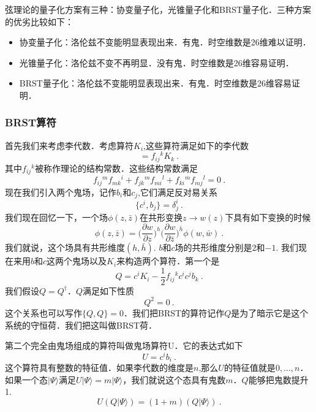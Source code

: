 
弦理论的量子化方案有三种：协变量子化，光锥量子化和BRST量子化．三种方案的优劣比较如下：
\begin{itemize}
\item 协变量子化：洛伦兹不变能明显表现出来．有鬼．时空维数是26维难以证明．
\item 光锥量子化：洛伦兹不变不再明显．没有鬼．时空维数是26维容易证明．
\item BRST量子化：洛伦兹不变能明显表现出来．有鬼．时空维数是26维容易证明．
\end{itemize}
\subsubsection{BRST算符}
首先我们来考虑李代数．考虑算符$K_i$,这些算符满足如下的李代数
\begin{equation}
[K_i,K_j] = f_{ij}{}^k K_k~.
\end{equation}
其中$f_{ij}{}^k$被称作理论的结构常数．这些结构常数满足
\begin{equation}
f_{ij}{}^m f_{mk}{}^i + f_{jk}{}^m f_{mi}{}^l+f_{ki}{}^m f_{mj}{}^l = 0 ~. 
\end{equation}
现在我们引入两个鬼场，记作$b_i$和$c_j$,它们满足反对易关系
\begin{equation}
\{ c^i, b_j \} = \delta^i_j~.
\end{equation}
我们现在回忆一下，一个场$\phi(z,\bar z)$在共形变换$z\rightarrow w(z)$下具有如下变换的时候
\begin{equation}
\phi(z,\bar z) = \bigg( \frac{\partial w}{\partial z} \bigg)^h \bigg( \frac{\partial w}{\partial \bar z} \bigg)^{\bar h} \phi (w,\bar w)~.
\end{equation}
我们就说，这个场具有共形维度$(h,\bar h)$. $b$和$c$场的共形维度分别是$2$和$-1$. 我们现在来用$b$和$c$这两个鬼场以及$K_i$来构造两个算符．第一个是
\begin{equation}
Q = c^i K_i - \frac{1}{2} f_{ij}{}^k c^i c^j b_k~.
\end{equation}
我们假设$Q = Q^\dagger$．$Q$满足如下性质
\begin{equation}
Q^2 = 0~.
\end{equation}
这个关系也可以写作$\{Q,Q\}=0$．我们把BRST的算符记作$Q$是为了暗示它是这个系统的守恒荷．我们把这叫做BRST荷．

第二个完全由鬼场组成的算符叫做鬼场算符U．它的表达式如下
\begin{equation}\label{BRST_eq1}
U = c^i b_i~.
\end{equation}
这个算符具有整数的特征值．如果李代数的维度是$n$,那么$U$的特征值就是$0,\ldots ,n$．如果一个态$|\Psi\rangle$满足$U|\Psi\rangle=m|\Psi\rangle$，我们就说这个态具有鬼数$m$．$Q$能够把鬼数提升1.
\begin{equation}
U (Q|\Psi\rangle) = (1+m) (Q|\Psi\rangle)~. 
\end{equation}
